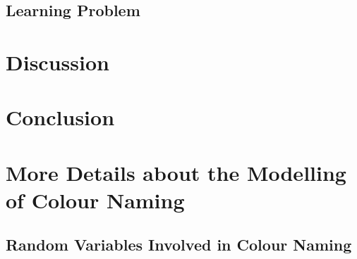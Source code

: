 \documentclass[11pt]{article}
\begin{document}
\subsection{Learning Problem}
\label{ssec:results_learning}

 
\section{Discussion}
\section{Conclusion}




\appendix

\section{More Details about the Modelling of Colour Naming}
\label{appsec:more_details}

\subsection{Random Variables Involved in Colour Naming}
\label{appssec:uni_components}
\end{document}
